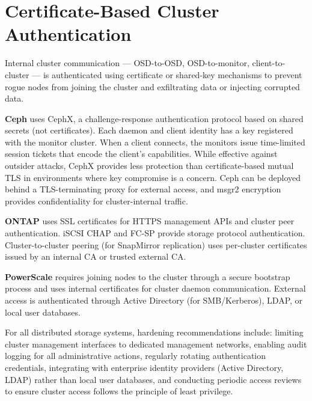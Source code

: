 \section{Certificate-Based Cluster Authentication}
Internal cluster communication --- OSD-to-OSD, OSD-to-monitor, client-to-cluster --- is authenticated using certificate or shared-key mechanisms to prevent rogue nodes from joining the cluster and exfiltrating data or injecting corrupted data.

\textbf{Ceph} uses CephX, a challenge-response authentication protocol based on shared secrets (not certificates). Each daemon and client identity has a key registered with the monitor cluster. When a client connects, the monitors issue time-limited session tickets that encode the client's capabilities. While effective against outsider attacks, CephX provides less protection than certificate-based mutual TLS in environments where key compromise is a concern. Ceph can be deployed behind a TLS-terminating proxy for external access, and msgr2 encryption provides confidentiality for cluster-internal traffic.

\textbf{ONTAP} uses SSL certificates for HTTPS management APIs and cluster peer authentication. iSCSI CHAP and FC-SP provide storage protocol authentication. Cluster-to-cluster peering (for SnapMirror replication) uses per-cluster certificates issued by an internal CA or trusted external CA.

\textbf{PowerScale} requires joining nodes to the cluster through a secure bootstrap process and uses internal certificates for cluster daemon communication. External access is authenticated through Active Directory (for SMB/Kerberos), LDAP, or local user databases.

For all distributed storage systems, hardening recommendations include: limiting cluster management interfaces to dedicated management networks, enabling audit logging for all administrative actions, regularly rotating authentication credentials, integrating with enterprise identity providers (Active Directory, LDAP) rather than local user databases, and conducting periodic access reviews to ensure cluster access follows the principle of least privilege.

